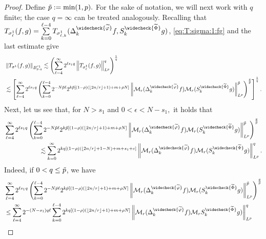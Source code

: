 \begin{proof}
  Define $\tilde{p}:=\min(1,p).$  For the sake of notation, we will next work with $q$ finite; the case $q=\infty$ can be treated analogously.
  Recalling that $T_{\sigma^1_\ell}(f,g)= \sum\limits_{k=0}^{\ell -4} T_{\sigma^1_{\ell,k}}(\Delta^{\widecheck{\widetilde{\f}}}_k f,S^{\widecheck{\widetilde{\Phi}}}_k g)$,  \eqref{eq:T:sigma:1:fg} and the last  estimate give
\begin{align}
& \norm{T_{\sigma^1}(f,g)}{\ibes{p}{s_1}{q}}  \lesssim  \left( \sum\limits_{\ell=4}^\infty 2^{\ell s_1q} \norm{T_{\sigma^1_\ell}(f,g)}{L^p}^q \right)^\frac{1}{q}\label{eq:T1:fg:Fqp}\\
& \lesssim  \left[  \sum\limits_{\ell=4}^\infty 2^{\ell s_1 q} \left(  \sum\limits_{k=0}^{\ell -4} 2^{- N\pst \ell} 2^{k\pst [(1-\rho)( \lfloor{2n/r}\rfloor + 1)+m+\rho N]}   \norm{\mathcal{M}_r(\Delta^{\widecheck{\widetilde{\f}}}_kf)\mathcal{M}_r(S^{\widecheck{\widetilde{\Phi}}}_k g)}{L^p}^{\pst}\right)^\frac{q}{\pst} \right]^\frac{1}{q}. \nonumber
\end{align}
Next, let us see that, for  $N>s_1$ and $0<\epsilon< N-s_1,$  it holds that
\begin{align}\nonumber
& \sum\limits_{\ell=4}^\infty 2^{\ell  s_1 q} \left(  \sum\limits_{k=0}^{\ell -4} 2^{- N \pst\ell} 2^{k \pst[(1-\rho)( \lfloor{2n/r}\rfloor + 1)+m+\rho N]}    \norm{\mathcal{M}_r(\Delta^{\widecheck{\widetilde{\f}}}_k f)\mathcal{M}_r(S^{\widecheck{\widetilde{\Phi}}}_kg)}{L^p}^{\pst}\right)^{\frac{q}{\pst}} \\ \label{eq:moving:the:sums}
&\hspace{2cm}\lesssim \sum\limits_{k=0}^\infty 2^{k q[ (1-\rho)( \lfloor{2n/r}\rfloor + 1-N) + m+ s_1+\eps] }   \norm{\mathcal{M}_r(\Delta^{\widecheck{\widetilde{\f}}}_k f)\mathcal{M}_r(S^{\widecheck{\widetilde{\Phi}}}_k g)}{L^p}^q.
\end{align}
 Indeed, if $0 < q \leq \tilde{p}$, we have
\begin{align*}
& \sum\limits_{\ell=4}^\infty  2^{\ell  s_1 q} \left(  \sum\limits_{k=0}^{\ell -4} 2^{- N \pst \ell} 2^{k \pst [(1-\rho)( \lfloor{2n/r}\rfloor + 1)+m+\rho N]}   \norm{\mathcal{M}_r(\Delta^{\widecheck{\widetilde{\f}}}_k f)\mathcal{M}_r(S^{\widecheck{\widetilde{\Phi}}}_k g)}{L^p}^{\pst}\right)^\frac{q}{\pst} \\
& \leq \sum\limits_{\ell=4}^\infty 2^{-(N-s_1) q \ell} \sum\limits_{k=0}^{\ell -4}  2^{k q [(1-\rho)( \lfloor{2n/r}\rfloor + 1) + m+\rho N]}   \norm{\mathcal{M}_r(\Delta^{\widecheck{\widetilde{\f}}}_k f)\mathcal{M}_rS^{\widecheck{\widetilde{\Phi}}}_k g)}{L^p}^q\\

\end{align*}
\end{proof}
